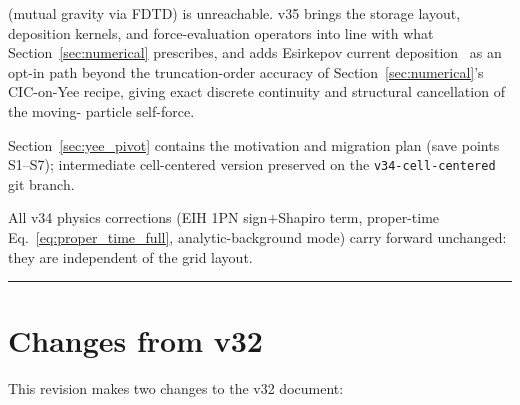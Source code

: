 \documentclass[11pt,a4paper]{article}
\begin{document}
\begin{titlepage}
{  (mutual gravity via FDTD) is unreachable.  v35 brings the storage
  layout, deposition kernels, and force-evaluation operators into
  line with what Section~\ref{sec:numerical} prescribes, and adds
  Esirkepov current deposition~\cite{Esirkepov2001} as an opt-in
  path beyond the truncation-order accuracy of
  Section~\ref{sec:numerical}'s CIC-on-Yee recipe, giving exact
  discrete continuity and structural cancellation of the moving-
  particle self-force.\par
  Section~\ref{sec:yee_pivot} contains the motivation and migration
  plan (save points S1--S7); intermediate cell-centered version
  preserved on the \texttt{v34-cell-centered} git branch.\par
  All v34 physics corrections (EIH 1PN sign$+$Shapiro term,
  proper-time Eq.~\ref{eq:proper_time_full}, analytic-background
  mode) carry forward unchanged: they are independent of the grid
  layout.\par}
  \vspace{1.5cm}
  \hrule
\end{titlepage}

\tableofcontents
\newpage

\section*{Changes from v32}

This revision makes two changes to the v32 document:
\end{document}
